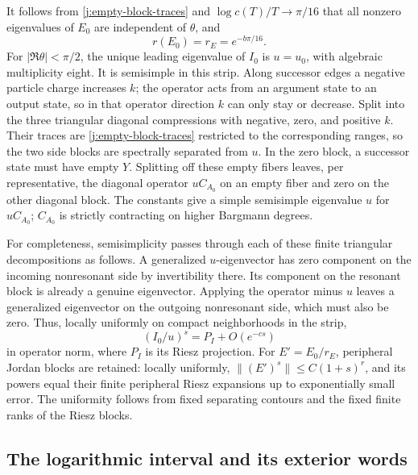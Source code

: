 It follows from \eqref{j:empty-block-traces} and
$\log c(T)/T\to\pi/16$ that all nonzero eigenvalues of $E_0$ are
independent of $\theta$, and
\begin{equation}\label{j:exterior-radius}
 r(E_0)=r_E=e^{-b\pi/16}.
\end{equation}
For $|\Re\theta|<\pi/2$, the unique leading eigenvalue of $I_0$ is
$u=u_0$, with algebraic multiplicity eight. It is semisimple in this
strip. Along successor edges a negative particle charge increases $k$;
the operator acts from an argument state to an output state, so in that
operator direction $k$ can only stay or decrease. Split into the three
triangular diagonal compressions with negative, zero, and positive $k$.
Their traces are \eqref{j:empty-block-traces} restricted to the
corresponding ranges, so the two side blocks are spectrally separated
from $u$. In the zero block, a successor state must have empty $Y$.
Splitting off these empty fibers leaves, per representative, the diagonal
operator $uC_{A_0}$ on an empty fiber and zero on the other diagonal block.
The constants give a simple semisimple eigenvalue $u$ for $uC_{A_0}$;
$C_{A_0}$ is strictly contracting on higher Bargmann degrees.

For completeness, semisimplicity passes through each of these finite
triangular decompositions as follows. A generalized $u$-eigenvector has
zero component on the incoming nonresonant side by invertibility there.
Its component on the resonant block is already a genuine eigenvector.
Applying the operator minus $u$ leaves a generalized eigenvector on the
outgoing nonresonant side, which must also be zero. Thus, locally uniformly
on compact neighborhoods in the strip,
\begin{equation}\label{j:interior-powers}
 (I_0/u)^s=P_I+O(e^{-cs})
\end{equation}
in operator norm, where $P_I$ is its Riesz projection. For
$E'=E_0/r_E$, peripheral Jordan blocks are retained: locally uniformly,
$\|(E')^s\|\le C(1+s)^r$, and its powers equal their finite peripheral
Riesz expansions up to exponentially small error. The uniformity follows
from fixed separating contours and the fixed finite ranks of the Riesz
blocks.

\subsection{The logarithmic interval and its exterior words}

